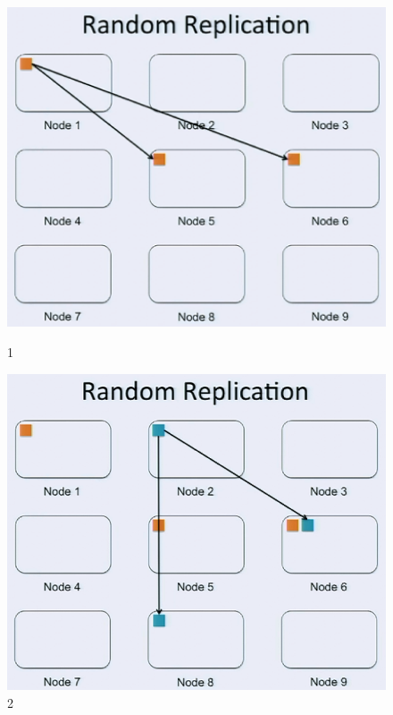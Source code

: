 \documentclass[xcolor=table]{beamer}
\begin{document}
	\begin{frame}
		\begin{figure}[htb]
			\centering
			\begin{minipage}[b]{0.49\linewidth}
				\centering
				\includegraphics[width=1\textwidth]{1.png}
				\caption{1}
			\end{minipage}
			\begin{minipage}[b]{0.49\linewidth}
				\centering
				\includegraphics[width=1\textwidth]{2.png}
				\caption{2}
			\end{minipage}
		\end{figure}
	\end{frame}
\end{document}

